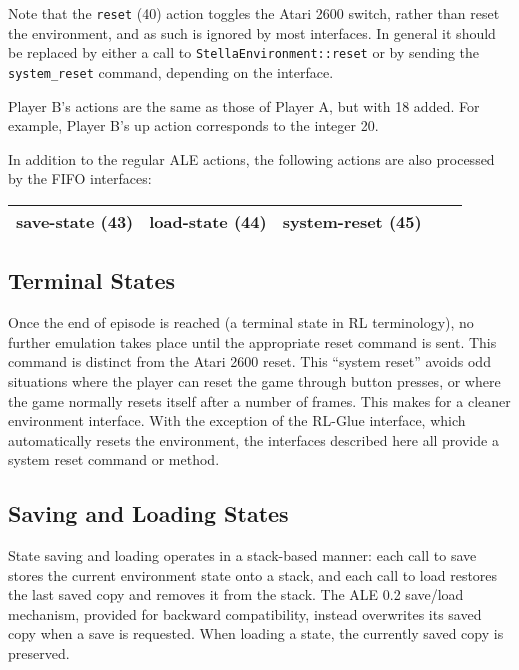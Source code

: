\documentclass[12pt]{article}
\begin{document}
Note that the \verb+reset+ (40) action toggles the Atari 2600 switch, rather than reset the 
environment, and as such is ignored by most interfaces.
In general it should be replaced by either a call to \verb+StellaEnvironment::reset+ or by
sending the \verb+system_reset+ command, depending on the interface. 

Player B's actions are the same as those of Player A, but with 18 added. For example, Player B's
up action corresponds to the integer 20.

In addition to the regular ALE actions, the following actions are also processed by the 
FIFO interfaces:

\begin{center}
\begin{tabular}{|r|r|r|r|r|}
\hline
save-state (43) & load-state (44) & system-reset (45) \\
\hline
\end{tabular}
\end{center}

\subsection{Terminal States}

Once the end of episode is reached (a terminal state in RL terminology), no further emulation 
takes place until the appropriate reset command is sent. This command is distinct from the Atari 
2600 reset. This ``system reset'' avoids odd situations where the player can reset the game
through button presses, or where the game normally resets itself after a number of frames. This 
makes for a cleaner environment interface. With the exception of the RL-Glue interface, which 
automatically resets the environment, the interfaces described here all provide a system reset
command or method.

\subsection{Saving and Loading States}

State saving and loading operates in a stack-based manner: each call to save stores the current
environment state onto a stack, and each call to load restores the last saved copy and removes
it from the stack. The ALE 0.2 save/load mechanism, provided for backward compatibility, instead
overwrites its saved copy when a save is requested. When loading a state, the currently saved copy
is preserved.
\end{document}
